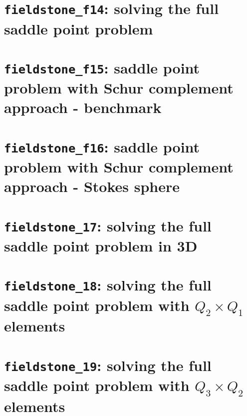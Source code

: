 \documentclass[a4paper]{article}
\begin{document}
\newpage
\section{{\tt fieldstone\_f14}: solving the full saddle point problem \label{f14}}


\newpage
\section{{\tt fieldstone\_f15}: saddle point problem with Schur complement approach - benchmark \label{f15}}


\newpage
\section{{\tt fieldstone\_f16}: saddle point problem with Schur complement approach - Stokes sphere \label{f16}}


\newpage
\section{{\tt fieldstone\_17}: solving the full saddle point problem in 3D \label{f17}}


\newpage
\section{{\tt fieldstone\_18}: solving the full saddle point problem with $Q_2\times Q_1$ elements \label{f18}}


\newpage
\section{{\tt fieldstone\_19}: solving the full saddle point problem with $Q_3\times Q_2$ elements \label{f19}}

\end{document}
